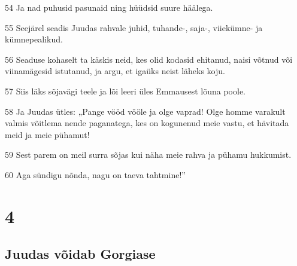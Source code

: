 \par 54 Ja nad puhusid pasunaid ning hüüdsid suure häälega.
\par 55 Seejärel seadis Juudas rahvale juhid, tuhande-, saja-, viiekümne- ja kümnepealikud.
\par 56 Seaduse kohaselt ta käskis neid, kes olid kodasid ehitanud, naisi võtnud või viinamägesid istutanud, ja argu, et igaüks neist läheks koju.
\par 57 Siis läks sõjavägi teele ja lõi leeri üles Emmausest lõuna poole.
\par 58 Ja Juudas ütles: „Pange vööd vööle ja olge vaprad! Olge homme varakult valmis võitlema nende paganatega, kes on kogunenud meie vastu, et hävitada meid ja meie pühamut!
\par 59 Sest parem on meil surra sõjas kui näha meie rahva ja pühamu hukkumist.
\par 60 Aga sündigu nõnda, nagu on taeva tahtmine!”

\chapter{4}

\section*{Juudas võidab Gorgiase}


